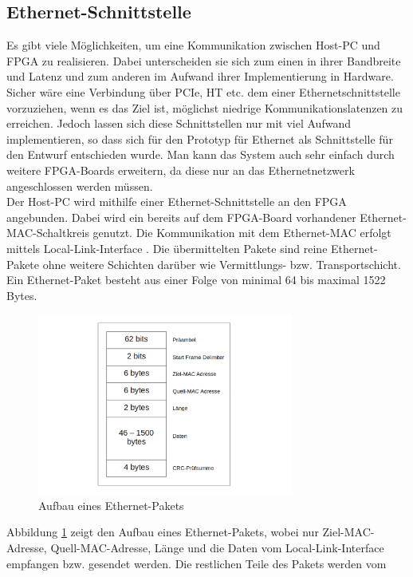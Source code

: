 \subsection{Ethernet-Schnittstelle}
\label{ethernet}
Es gibt viele Möglichkeiten, um eine Kommunikation zwischen Host-PC
und FPGA zu realisieren. Dabei unterscheiden sie sich zum einen 
in ihrer Bandbreite und Latenz und zum anderen
im Aufwand ihrer Implementierung in Hardware. Sicher wäre eine
Verbindung über PCIe, HT etc. dem einer Ethernetschnittstelle vorzuziehen,
wenn es das Ziel ist, möglichst niedrige Kommunikationslatenzen zu erreichen.
Jedoch lassen sich diese Schnittstellen nur mit viel Aufwand implementieren,
so dass sich für den Prototyp für
Ethernet als Schnittstelle für den Entwurf entschieden wurde. 
Man kann das System auch sehr einfach durch weitere FPGA-Boards erweitern,
da diese nur an das Ethernetnetzwerk angeschlossen werden müssen.\\
Der Host-PC wird mithilfe einer Ethernet-Schnittstelle an den FPGA angebunden. 
Dabei wird ein bereits auf dem FPGA-Board vorhandener Ethernet-MAC-Schaltkreis genutzt. 
Die Kommunikation mit dem Ethernet-MAC erfolgt mittels Local-Link-Interface \cite{xilinxlocallink:2005}. 
Die übermittelten Pakete sind reine Ethernet-Pakete ohne weitere Schichten darüber 
wie Vermittlungs- bzw. Transportschicht. Ein Ethernet-Paket besteht aus einer Folge von 
minimal 64 bis maximal 1522\,Bytes. 
\begin{figure}[h]
  \centering
  \includegraphics[width=0.75\textwidth]{abb/ethernet.png}
  \caption{Aufbau eines Ethernet-Pakets}
  \label{ether}
\end{figure}
Abbildung \ref{ether} zeigt den Aufbau eines Ethernet-Pakets,
wobei nur Ziel-MAC-Adresse, Quell-MAC-Adresse, Länge und die Daten vom Local-Link-Interface 
empfangen bzw. gesendet werden. Die restlichen Teile des Pakets werden vom 
